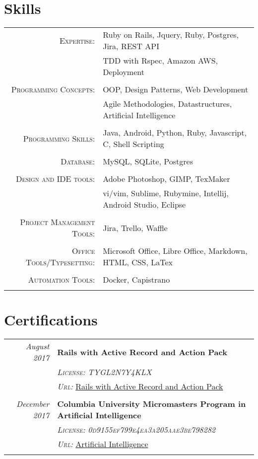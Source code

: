 \documentclass[a4paper,10pt]{article}
\begin{document}
\section{Skills}
\begin{tabular}{rl}	
\textsc{Expertise:} &Ruby on Rails, Jquery, Ruby, Postgres, Jira, REST API\\
								& TDD with Rspec, Amazon AWS, Deployment \\\\
\textsc{Programming Concepts:} &OOP, Design Patterns, Web Development \\
								&  Agile Methodologies, Datastructures, Artificial Intelligence\\\\
\textsc{Programming Skills:}  & Java, Android, Python, Ruby, Javascript, C, Shell Scripting\\\\
\textsc{Database:} & MySQL, SQLite, Postgres\\\\

\textsc{Design and IDE tools:} & Adobe Photoshop, GIMP, TexMaker\\
							   & vi/vim, Sublime, Rubymine, Intellij, Android Studio, Eclipse\\\\
\textsc{Project Management Tools:} & Jira, Trello, Waffle\\\\	
\textsc{Office Tools/Typesetting:} & Microsoft Office, Libre Office, Markdown, HTML, CSS, LaTex\\\\
								   
\textsc{Automation Tools:} &Docker, Capistrano\\\\
		 
\end{tabular}

\section{Certifications}
\begin{tabular}{r|p{11cm}}
\emph{August 2017} & \textbf{Rails with Active Record and Action Pack}\\  & \emph{\textsc{License: TYGL2N7Y4KLX}} \\&\emph{\textsc{Url:}}  \href{https://www.coursera.org/account/accomplishments/certificate/TYGL2N7Y4KLX}{Rails with Active Record and Action Pack} \\\multicolumn{2}{c}{} \\
\emph{December 2017} & \textbf{Columbia University Micromasters Program in Artificial Intelligence}\\  & \emph{\textsc{License: 0d9155ef799e4ea3a205aae3be798282}} \\&\emph{\textsc{Url:}}  \href{https://courses.edx.org/certificates/0d9155ef799e4ea3a205aae3be798282}{Artificial Intelligence} \\\multicolumn{2}{c}{} \\
\end{tabular}
\end{document}
